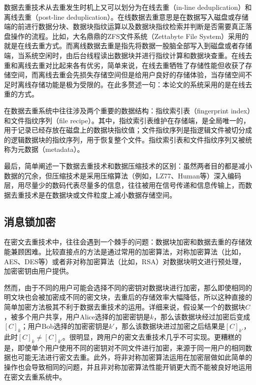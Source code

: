 \documentclass[promaster]{thesis-uestc}
\begin{document}
数据去重技术从去重发生时机上又可以划分为在线去重（in-line deduplication）和离线去重（post-line deduplication）。在线数据去重意思是在数据写入磁盘或存储端的前进行数据分块、数据块指纹运算以及数据块指纹检索并判断是否需要真正落盘操作的流程。比如，大名鼎鼎的ZFS文件系统（Zettabyte File System）采用的就是在线去重方式。而离线数据去重是指先将数据一股脑全部写入到磁盘或者存储端，当系统空闲时，由后台线程读出数据块并进行指纹计算和数据块查重。在线去重和离线去重对比起来各有优劣，简单来说，在线去重牺牲了存储性能但收获了存储空间，而离线去重会先损失存储空间但是给用户良好的存储体验，当存储空间不足时离线存储功能是极为受限的。在此多赘述一句：本论文的系统采用的是在线去重的方式。

在数据去重系统中往往涉及两个重要的数据结构：指纹索引表（fingerprint index）和文件指纹序列（file recipe）。其中，指纹索引表维护在存储端，是全局唯一的，用于记录已经存放在磁盘上的数据块指纹值；文件指纹序列是指逻辑文件被切分成的逻辑数据块的指纹序列，用于恢复整个文件。指纹索引表和文件指纹序列又被统称为元数据（metadata）。

最后，简单阐述一下数据去重技术和数据压缩技术的区别：虽然两者目的都是减小数据的冗余，但压缩技术是采用压缩算法（例如，LZ77、Human等）深入编码层，用尽量少的数码代表尽量多的信息，往往被用在信号传递和信息传输上，而数据去重技术是在数据块或文件粒度上减小数据存储空间。

\subsection{消息锁加密}\label{消息锁加密}%
在密文去重技术中，往往会遇到一个棘手的问题：数据块加密和数据去重的存储效能兼顾困难。比较直接点的方法是通过常用的加密算法，对称加密算法（比如，AES、DES等）或者非对称加密算法（比如，RSA）对数据块明文进行预处理，加密密钥由用户提供。

然而，由于不同的用户可能会选择不同的密钥对数据块进行加密，那么即使相同的明文块也会被加密成不同的密文块，去重后的存储效率大幅降低，所以这种直接的简单加密方法极其不利于数据去重技术的运用。详细来说，假设某一个的数据块$C$，被多个用户共享，用户Alice选择的加密密钥是$k$，那么该数据块经过加密后变成$[C]_k$；用户Bob选择的加密密钥是$k'$，那么该数据块进过加密之后结果是$[C]_{k'}$，此时$[C]_k \neq [C]_{k'}$。很明显，跨用户的密文去重技术几乎不可实现。更糟糕的是，即使单个用户使用不同的密钥对不同文件进行加密，来源于同一用户的相同数据也可能无法进行密文去重。此外，将非对称加密算法运用在加密层做如此简单的操作也会导致相同的问题，并且非对称加密算法性能开销更大而不能被良好地运用在密文去重系统中。
\end{document}
